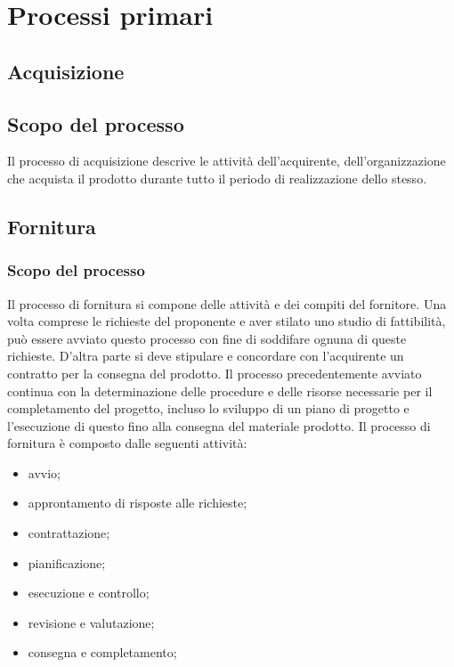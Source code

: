 \section{Processi primari}
\subsection{Acquisizione}
\subsection{Scopo del processo}
Il processo di acquisizione descrive le attività dell'acquirente, dell'organizzazione che acquista il prodotto durante tutto il periodo di realizzazione dello stesso.
\subsection{Fornitura}
\subsubsection{Scopo del processo}
Il processo di fornitura si compone delle attività e dei compiti del fornitore. Una volta comprese le richieste del proponente e aver stilato uno studio di fattibilità, può essere avviato questo processo con fine di soddifare ognuna di queste richieste. D'altra parte si deve stipulare e concordare con l'acquirente un contratto per la consegna del prodotto.
Il processo precedentemente avviato continua con la determinazione delle procedure e delle risorse necessarie per il completamento del progetto, incluso lo sviluppo di un piano di progetto e l'esecuzione di questo fino alla consegna del materiale prodotto.
Il processo di fornitura è composto dalle seguenti attività:
\begin{itemize}
	\item avvio;
	\item approntamento di risposte alle richieste;
	\item contrattazione;
	\item pianificazione;
	\item esecuzione e controllo;
	\item revisione e valutazione;
	\item consegna e completamento;
\end{itemize}
